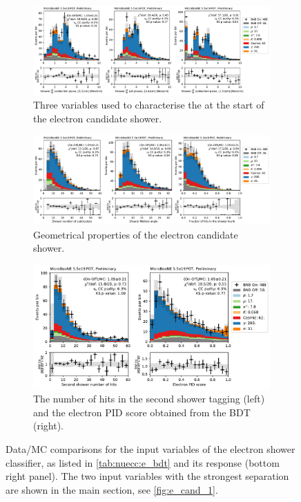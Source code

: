 \begin{figure}[htb] 
\begin{center}
    \begin{subfigure}{\textwidth}
    \centering
    \includegraphics[height=0.27\textheight]{NueCCsel/Images/datamc/e_cand_dedx}
    \caption{\label{fig:nuecc:e_cand_dedx} Three variables used to characterise the \dedx at the start of the electron candidate shower.}
    \end{subfigure}
    \begin{subfigure}{\textwidth}
    \centering
    \includegraphics[height=0.27\textheight]{NueCCsel/Images/datamc/e_cand_2.pdf}
    \caption{\label{fig:nuecc:e_cand2} Geometrical properties of the electron candidate shower.}
    \end{subfigure}
    \begin{subfigure}{\textwidth}
    \centering
    \includegraphics[height=0.27\textheight]{NueCCsel/Images/datamc/e_cand_3.pdf}
    \caption{\label{fig:nuecc:e_cand3} The number of hits in the second shower tagging (left) and the electron PID score obtained from the BDT (right).}
    \end{subfigure}
    \end{center}
\caption{\label{fig:nuecc:e_cand_all} Data/MC comparisons for the input variables of the electron shower classifier, as listed in \cref{tab:nuecc:e_bdt} and its response (bottom right panel). The two input variables with the strongest separation are shown in the main section, see \cref{fig:e_cand_1}.}
\end{figure}

